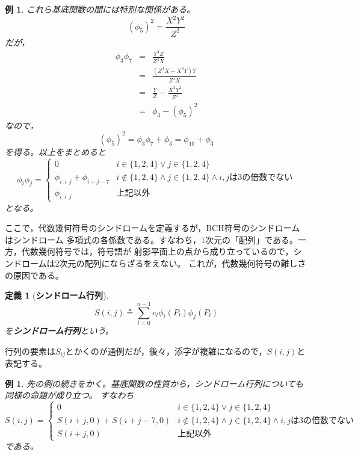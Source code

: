 \documentclass[12pt]{jarticle}
\theoremstyle{break}
\newtheorem{example}[theorem]{例}
\newtheorem{definition}[theorem]{定義}
\begin{document}
\begin{example}
これら基底関数の間には特別な関係がある。
\begin{equation}
(\phi_{5})^{2}=\frac{X^{2}Y^{2}}{Z^{2}}\nonumber
\end{equation}
だが，
\begin{eqnarray}
\phi_{3}\phi_{7}&=&\frac{Y^{4}Z}{Z^{4}X}\nonumber\\
&=&\frac{(Z^{3}X-X^{3}Y)Y}{Z^{4}X}\nonumber\\
&=&\frac{Y}{Z}-\frac{X^{2}Y^{2}}{Z^{4}}\nonumber\\
&=&\phi_{3}-(\phi_{5})^{2}\nonumber
\end{eqnarray}
なので，
\begin{equation}
(\phi_{5})^{2}=\phi_{3}\phi_{7}+\phi_{3}=\phi_{10}+\phi_{3}\nonumber
\end{equation}
を得る。以上をまとめると
\begin{equation}
\phi_{i}\phi_{j}=
\begin{cases}
0&i\in\{1,2,4\}\vee j\in\{1,2,4\}\\
\phi_{i+j}+\phi_{i+j-7}&i\not\in\{1,2,4\}\wedge j\in\{1,2,4\}\wedge
i,jは3の倍数でない\\
\phi_{i+j}&上記以外
\end{cases}
\nonumber
\end{equation}
となる。
\end{example}
ここで，代数幾何符号のシンドロームを定義するが，BCH符号のシンドロームはシンドローム
多項式の各係数である。すなわち，$1$次元の「配列」である。一方，代数幾何符号では，符号語が
射影平面上の点から成り立っているので，シンドロームは$2$次元の配列にならざるをえない。
これが，代数幾何符号の難しさの原因である。
\begin{framed}
\begin{definition}[{\bf シンドローム行列}]
\begin{equation}
S(i,j)\triangleq\sum_{l=0}^{n-1}e_{l}\phi_{i}(P_{l})\phi_{j}(P_{l})
\label{eq:syndrome_matrix}
\end{equation}
を{\bf シンドローム行列}という。
\end{definition}
\end{framed}
行列の要素は$S_{ij}$とかくのが通例だが，後々，添字が複雑になるので，$S(i,j)$と表記する。
\begin{example}
先の例の続きをかく。基底関数の性質から，シンドローム行列についても同様の命題が成り立つ。
すなわち
\begin{equation}
S(i,j)=
\begin{cases}
0&i\in\{1,2,4\}\vee j\in\{1,2,4\}\\
S(i+j,0)+S(i+j-7,0)&i\not\in\{1,2,4\}\wedge j\in\{1,2,4\}\wedge
i,jは3の倍数でない\\
S(i+j,0)&上記以外
\end{cases}
\nonumber
\end{equation}
である。
\end{example}
\end{document}
